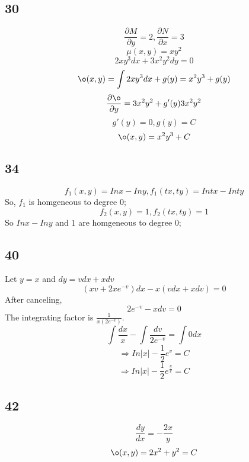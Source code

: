 \documentclass[12pt, a4paper]{IEEEtran}
\begin{document}
    \subsection*{30}
    $$\frac{\partial M}{\partial y}=2, \frac{\partial N}{\partial x}=3$$
    $$\mu(x,y)=xy^2$$
    $$2xy^3dx+3x^2y^2dy=0$$
    $$\o(x,y)=\int 2xy^3 dx+g(y)=x^2y^3+g(y)$$
    $$\frac{\partial \o}{\partial y}=3x^2y^2+g'(y)3x^2y^2$$
    $$g'(y)=0, g(y)=C$$
    $$\o(x,y)=x^2y^3+C$$

    \subsection*{34}
    $$f_1(x,y)=Inx-Iny, f_1(tx,ty)=Intx-Inty$$
    So, $f_1$ is homgeneous to degree 0;
    $$f_2(x,y)=1, f_2(tx, ty)=1$$
    So $Inx-Iny$ and $1$ are homgeneous to degree 0;

    \subsection*{40}
    Let $y=x$ and $dy=vdx+xdv$
    $$(xv+2xe^{-v})dx-x(vdx+xdv)=0$$
    After canceling,
    $$2e^{-v}-xdv=0$$
    The integrating factor is $\frac{1}{x(2e^{-v})}$.
    $$\int \frac{dx}{x}-\int \frac{dv}{2e^{-v}}=\int 0 dx$$
    $$\Rightarrow In|x|-\frac{1}{2}e^v=C$$
    $$\Rightarrow In|x|-\frac{1}{2}e^\frac{y}{x}=C$$

    \subsection*{42}
    $$\frac{dy}{dx}=-\frac{2x}{y}$$
    $$\o(x,y)=2x^2+y^2=C$$
    \vspace{6cm}
\end{document}
